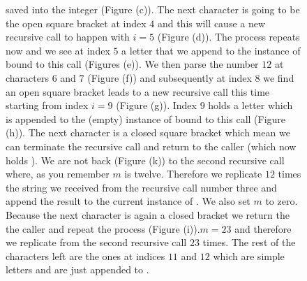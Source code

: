 \begin{figure}
{	saved into the integer  (Figure (c)). The next character is going to be the open
	square bracket at index $4$  and this will cause a new recursive call to happen with $i=5$
	(Figure (d)). The process repeats now and we see at index $5$ a letter that we append to the
	instance of  bound to this call (Figures (e)). We then parse the number $12$ at
	characters $6$ and $7$ (Figure (f)) and subsequently at index $8$ we find an open square bracket
	leads to a new recursive call this time starting from index $i=9$ (Figure (g)). Index $9$ holds
	a letter which is appended to the (empty) instance of  bound to this call (Figure
	(h)). The next character is a closed square bracket which mean we can terminate the recursive
	call and return to the caller  (which now holds ). We are not back
	(Figure (k)) to the second recursive call where, as you remember $m$ is twelve. Therefore we
	replicate $12$ times the string we received from the recursive call number three and append the
	result to the current instance of . We also set $m$ to zero. Because the next
	character is again a closed bracket we return the the caller and repeat the process (Figure
	(i)).$m=23$ and therefore we replicate  from the second recursive call $23$ times.
	The rest of the characters left are the ones at indices $11$ and $12$ which are simple letters
	and are just appended to .}	
   \label{fig:decode_string:recursion}
 \end{figure}

